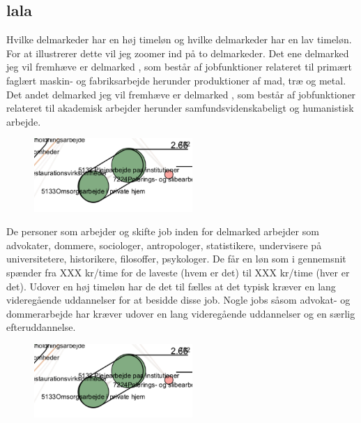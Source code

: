 
%
\subsection{ lala}
%




Hvilke delmarkeder har en høj timeløn og hvilke delmarkeder har en lav timeløn. For at illustrerer dette vil jeg zoomer ind på to delmarkeder. Det ene delmarked jeg vil fremhæve er delmarked , som består af jobfunktioner relateret til primært faglært maskin- og fabriksarbejde herunder produktioner af mad, træ og metal. Det andet delmarked jeg vil fremhæve er delmarked , som består af jobfunktioner relateret til akademisk arbejder herunder samfundsvidenskabeligt og humanistisk arbejde.
%
\begin{figure}
  \vspace{-20pt}
  \begin{center}
    \includegraphics[width=6cm]{fig/segzoom/seg_2_66.pdf}
   \caption{}
   \label{fig_delanalyse1_zoom_2_66}
  \end{center}
  \vspace{-20pt}
\end{figure}
%
De personer som arbejder og skifte job inden for delmarked  arbejder som advokater, dommere, sociologer, antropologer, statistikere, undervisere på universitetere, historikere, filosoffer, psykologer. De får en løn som i gennemsnit spænder fra XXX kr/time for de laveste (hvem er det) til XXX kr/time (hver er det). Udover en høj timeløn har de det til fælles at det typisk kræver en lang videregående uddannelser for at besidde disse job. Nogle jobs såsom advokat- og dommerarbejde har kræver udover en lang videregående uddannelser og en særlig efteruddannelse.
%
\begin{figure}
  \vspace{-20pt}
  \begin{center}
    \includegraphics[width=6cm]{fig/segzoom/seg_2_66.pdf}
   \caption{}
   \label{fig_delanalyse1_zoom_2_66}
  \end{center}
  \vspace{-20pt}
\end{figure}
